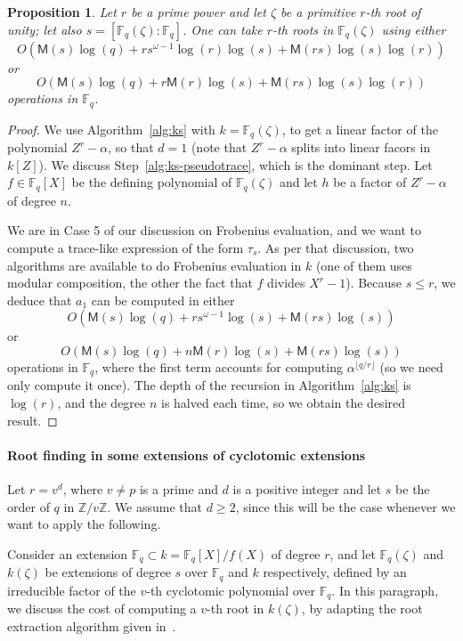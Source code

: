 \documentclass[12pt]{article}
\theoremstyle{plain}
\newtheorem{proposition}[theorem]{Proposition}
\theoremstyle{definition}
\def\Z{\ensuremath{\mathbb{Z}}}
\def\F{\ensuremath{\mathbb{F}}}
\def\MM{\ensuremath{\mathsf{M}}}
\newcounter{algorithm}
\begin{document}
\begin{proposition}
  \label{prop:root-fpz}
  Let $r$ be a prime power and let $\zeta$ be a primitive $r$-th root of unity; let also $s = 
  [\F_q(\zeta): \F_q]$. One can take $r$-th roots in 
  $\F_q(\zeta)$ using either 
  $$O(\MM(s)\log(q) + rs^{\omega-1}\log(r)\log(s) + \MM(rs)\log(s)\log(r))$$
  or
  $$O(\MM(s)\log(q) + r\MM(r)\log(s) + \MM(rs)\log(s)\log(r))$$ operations in $\F_q$. 
\end{proposition}
\begin{proof}
We use Algorithm~\ref{alg:ks} with $k=\F_q(\zeta)$, to get a linear
factor of the polynomial $Z^r-\alpha$, so that $d=1$ (note that
$Z^r-\alpha$ splits into linear facors in $k[Z]$). We discuss
Step~\ref{alg:ks-pseudotrace}, which is the dominant step. Let $f \in
\F_q[X]$ be the defining polynomial of $\F_q(\zeta)$ and let $h$ be a
factor of $Z^r-\alpha$ of degree $n$. 

We are in Case 5 of our discussion on Frobenius evaluation, and we
want to compute a trace-like expression of the form $\tau_s$. As per
that discussion, two algorithms are available to do Frobenius
evaluation in $k$ (one of them uses modular composition, the other the
fact that $f$ divides $X^r-1$). Because $s \le r$, we deduce that
$a_1$ can be computed in either
$$O(\MM(s)\log(q) + rs^{\omega-1}\log(s) + \MM(rs)\log(s))$$
or
$$O(\MM(s)\log(q) + n\MM(r)\log(s) + \MM(rs)\log(s))$$ operations in
$\F_q$, where the first term accounts for computing $\alpha^{\lfloor
  q/r \rfloor}$ (so we need only compute it once). The depth of the
recursion in Algorithm~\ref{alg:ks} is $\log(r)$, and the degree $n$
is halved each time, so we obtain the
desired result.
\end{proof}

\paragraph{Root finding in some extensions of cyclotomic extensions}
Let $r = v^d$, where $v \ne p$ is a prime and $d$ is a positive
integer and let $s$ be the order of $q$ in $\Z / v\Z$.  We 
assume that $d \ge 2$, since this will be the case whenever we want to
apply the following.

Consider an extension $\F_q \subset k=\F_q[X]/f(X)$ of degree $r$, and
let $\F_q(\zeta)$ and $k(\zeta)$ be extensions of degree $s$ over
$\F_q$ and $k$ respectively, defined by an irreducible factor of the
$v$-th cyclotomic polynomial over $\F_q$. In this paragraph, we
discuss the cost of computing a $v$-th root in $k(\zeta)$, by adapting
the root extraction algorithm given in~\cite{doliskanischost2011}.
\end{document}
